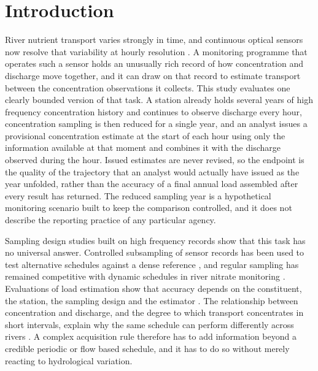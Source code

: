\documentclass[pdflatex,sn-mathphys-num]{sn-jnl}%
\theoremstyle{thmstyleone}%
\theoremstyle{thmstyletwo}%
\theoremstyle{thmstylethree}%
\begin{document}



\maketitle



\section{Introduction}\label{sec:introduction}

River nutrient transport varies strongly in time, and continuous optical sensors now resolve that variability at hourly resolution \citep{rode2016,bieroza2023}. A monitoring programme that operates such a sensor holds an unusually rich record of how concentration and discharge move together, and it can draw on that record to estimate transport between the concentration observations it collects. This study evaluates one clearly bounded version of that task. A station already holds several years of high frequency concentration history and continues to observe discharge every hour, concentration sampling is then reduced for a single year, and an analyst issues a provisional concentration estimate at the start of each hour using only the information available at that moment and combines it with the discharge observed during the hour. Issued estimates are never revised, so the endpoint is the quality of the trajectory that an analyst would actually have issued as the year unfolded, rather than the accuracy of a final annual load assembled after every result has returned. The reduced sampling year is a hypothetical monitoring scenario built to keep the comparison controlled, and it does not describe the reporting practice of any particular agency.

Sampling design studies built on high frequency records show that this task has no universal answer. Controlled subsampling of sensor records has been used to test alternative schedules against a dense reference \citep{rode2016,bieroza2023}, and regular sampling has remained competitive with dynamic schedules in river nitrate monitoring \citep{reynolds2016}. Evaluations of load estimation show that accuracy depends on the constituent, the station, the sampling design and the estimator \citep{lee2016,lee2019}. The relationship between concentration and discharge, and the degree to which transport concentrates in short intervals, explain why the same schedule can perform differently across rivers \citep{bieroza2018,moatar2007}. A complex acquisition rule therefore has to add information beyond a credible periodic or flow based schedule, and it has to do so without merely reacting to hydrological variation.
\end{document}
